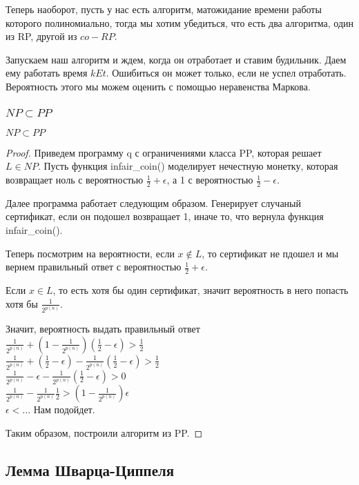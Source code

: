 Теперь наоборот, пусть у нас есть алгоритм, матожидание времени работы которого полиномиально, 
тогда мы хотим убедиться, что есть два алгоритма, один из RP, другой из $co-RP$.

Запускаем наш алгоритм и ждем, когда он отработает и ставим будильник. 
Даем ему работать время $k Et$. Ошибиться он может только, если не успел 
отработать. Вероятность этого мы можем оценить с помощью неравенства Маркова. 

\subsubsection{$NP \subset PP$}
\begin{theorem}
	$NP \subset PP$
\end{theorem}
\begin{proof}
	Приведем программу q с ограничениями класса PP, которая решает $L \in NP$. 
	Пусть функция infair\_coin() моделирует нечестную монетку, 
	которая возвращает ноль с вероятностью $\frac{1}{2} + \epsilon$, 
	а 1 с вероятностью $\frac{1}{2} - \epsilon$.

	Далее программа работает следующим образом. Генерирует 
	случаный сертификат, если он подошел возвращает 1, 
	иначе то, что вернула функция infair\_coin().

	Теперь посмотрим на вероятности, если $x \not \in L$, то сертификат 
	не пдошел и мы вернем правильный ответ с вероятностью $\frac{1}{2} + \epsilon$.

	Если $x \in L$, то есть хотя бы один сертификат, значит вероятность в него попасть 
	хотя бы $\frac{1}{2^{p(n)}}$.

	Значит, вероятность выдать правильный ответ \\
	$\frac{1}{2^{p(n)}} + (1 - \frac{1}{2^{p(n)}})(\frac{1}{2} - \epsilon) > \frac{1}{2}$ \\
	$\frac{1}{2^{p(n)}} + (\frac{1}{2} - \epsilon) - \frac{1}{2^{p(n)}}(\frac{1}{2} - \epsilon) > \frac{1}{2}$ \\
	$\frac{1}{2^{p(n)}} - \epsilon - \frac{1}{2^{p(n)}}(\frac{1}{2} - \epsilon) > 0$\\
	$\frac{1}{2^{p(n)}}  - \frac{1}{2^{p(n)}}\frac{1}{2} > (1 - \frac{1}{2^{p(n)}})\epsilon$\\
	$\epsilon < ...$ 
	Нам подойдет. 

	Таким образом, построили алгоритм из PP.	
\end{proof}

\subsection{Лемма Шварца-Циппеля}

